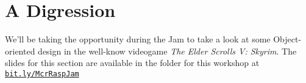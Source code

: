 \section{A Digression}

	We'll be taking the opportunity during the Jam to take a look at some Object-oriented design in the well-know videogame \textit{The Elder Scrolls V: Skyrim}.
	The slides for this section are available in the folder for this workshop at \mbox{\href{http://bit.ly/mcrraspjam}{\texttt{bit.ly/McrRaspJam}}}
